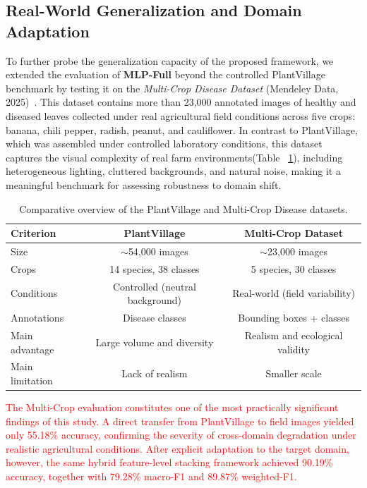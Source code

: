 \documentclass[pdflatex,sn-basic]{sn-jnl}
\begin{document}
\subsection{Real-World Generalization and Domain Adaptation}
To further probe the generalization capacity of the proposed framework, we extended the evaluation of \textbf{MLP-Full} beyond the controlled PlantVillage benchmark by testing it on the \textit{Multi-Crop Disease Dataset} (Mendeley Data, 2025)~\cite{PremKumar2025_MultiCrop}. This dataset contains more than 23,000 annotated images of healthy and diseased leaves collected under real agricultural field conditions across five crops: banana, chili pepper, radish, peanut, and cauliflower. In contrast to PlantVillage, which was assembled under controlled laboratory conditions, this dataset captures the visual complexity of real farm environments(Table ~\ref{tab:compar_dataset}), including heterogeneous lighting, cluttered backgrounds, and natural noise, making it a meaningful benchmark for assessing robustness to domain shift.

\begin{table}[h]
\centering
\caption{Comparative overview of the PlantVillage and Multi-Crop Disease datasets.}
\label{tab:compar_dataset}
\begin{tabular}{|l|c|c|}
\hline
\textbf{Criterion} & \textbf{PlantVillage} & \textbf{Multi-Crop Dataset} \\ \hline
Size & $\sim$54,000 images & $\sim$23,000 images \\ \hline
Crops & 14 species, 38 classes & 5 species, 30 classes \\ \hline
Conditions & Controlled (neutral background) & Real-world (field variability) \\ \hline
Annotations & Disease classes & Bounding boxes + classes \\ \hline
Main advantage & Large volume and diversity & Realism and ecological validity \\ \hline
Main limitation & Lack of realism & Smaller scale \\ \hline
\end{tabular}
\end{table}

\textcolor{red}{The Multi-Crop evaluation constitutes one of the most practically significant findings of this study. A direct transfer from PlantVillage to field images yielded only 55.18\% accuracy, confirming the severity of cross-domain degradation under realistic agricultural conditions. After explicit adaptation to the target domain, however, the same hybrid feature-level stacking framework achieved 90.19\% accuracy, together with 79.28\% macro-F1 and 89.87\% weighted-F1.}
\end{document}

